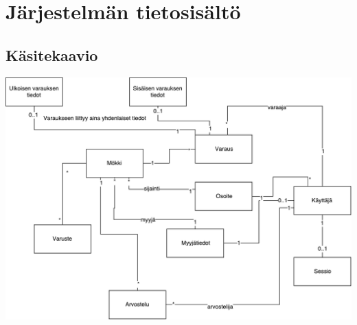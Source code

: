 \chapter{Järjestelmän tietosisältö}
\section{Käsitekaavio}

\includegraphics[width = 14cm]{./diagrams/drawio_entities.pdf}
